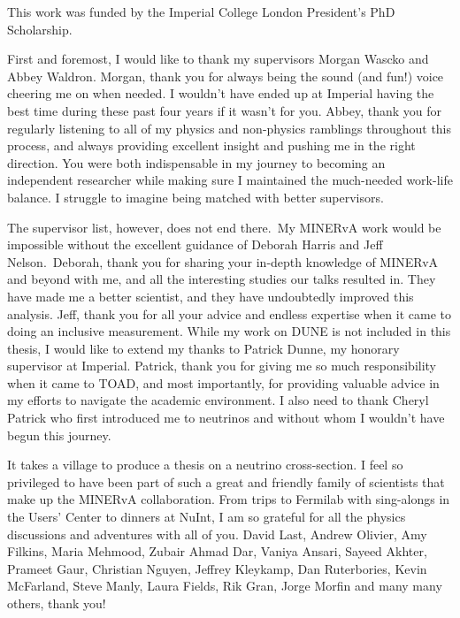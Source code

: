 \cleardoublepage


\begin{acknowledgements}
\vspace{15pt}
This work was funded by the Imperial College London President's PhD Scholarship.

First and foremost, I would like to thank my supervisors Morgan Wascko and Abbey Waldron. Morgan, thank you for always being the sound (and fun!) voice cheering me on when needed. I wouldn't have ended up at Imperial having the best time during these past four years if it wasn't for you. Abbey, thank you for regularly listening to all of my physics and non-physics ramblings throughout this process, and always providing excellent insight and pushing me in the right direction. You were both indispensable in my journey to becoming an independent researcher while making sure I maintained the much-needed work-life balance. I struggle to imagine being matched with better supervisors. 

The supervisor list, however, does not end there.~My MINERvA work would be impossible without the excellent guidance of Deborah Harris and Jeff Nelson.~Deborah, thank you for sharing your in-depth knowledge of MINERvA and beyond with me, and all the interesting studies our talks resulted in. They have made me a better scientist, and they have undoubtedly improved this analysis. Jeff, thank you for all your advice and endless expertise when it came to doing an inclusive measurement. While my work on DUNE is not included in this thesis, I would like to extend my thanks to Patrick Dunne, my honorary supervisor at Imperial. Patrick, thank you for giving me so much responsibility when it came to TOAD, and most importantly, for providing valuable advice in my efforts to navigate the academic environment. I also need to thank Cheryl Patrick who first introduced me to neutrinos and without whom I wouldn't have begun this journey.

It takes a village to produce a thesis on a neutrino cross-section. I feel so privileged to have been part of such a great and friendly family of scientists that make up the MINERvA collaboration. From trips to Fermilab with sing-alongs in the Users' Center to dinners at NuInt, I am so grateful for all the physics discussions and adventures with all of you. David Last, Andrew Olivier, Amy Filkins, Maria Mehmood, Zubair Ahmad Dar, Vaniya Ansari, Sayeed Akhter, Prameet Gaur, Christian Nguyen, Jeffrey Kleykamp, Dan Ruterbories, Kevin McFarland, Steve Manly, Laura Fields, Rik Gran, Jorge Morfin and many many others, thank you!


\end{acknowledgements}
